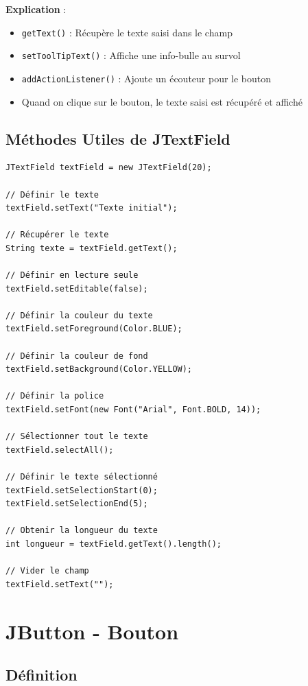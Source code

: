 \documentclass[11pt,a4paper]{article}
\begin{document}
\textbf{Explication} :
\begin{itemize}
    \item \texttt{getText()} : Récupère le texte saisi dans le champ
    \item \texttt{setToolTipText()} : Affiche une info-bulle au survol
    \item \texttt{addActionListener()} : Ajoute un écouteur pour le bouton
    \item Quand on clique sur le bouton, le texte saisi est récupéré et affiché
\end{itemize}

\subsection{Méthodes Utiles de JTextField}

\begin{lstlisting}
JTextField textField = new JTextField(20);

// Définir le texte
textField.setText("Texte initial");

// Récupérer le texte
String texte = textField.getText();

// Définir en lecture seule
textField.setEditable(false);

// Définir la couleur du texte
textField.setForeground(Color.BLUE);

// Définir la couleur de fond
textField.setBackground(Color.YELLOW);

// Définir la police
textField.setFont(new Font("Arial", Font.BOLD, 14));

// Sélectionner tout le texte
textField.selectAll();

// Définir le texte sélectionné
textField.setSelectionStart(0);
textField.setSelectionEnd(5);

// Obtenir la longueur du texte
int longueur = textField.getText().length();

// Vider le champ
textField.setText("");
\end{lstlisting}

\newpage

\section{JButton - Bouton}

\subsection{Définition}
\end{document}
